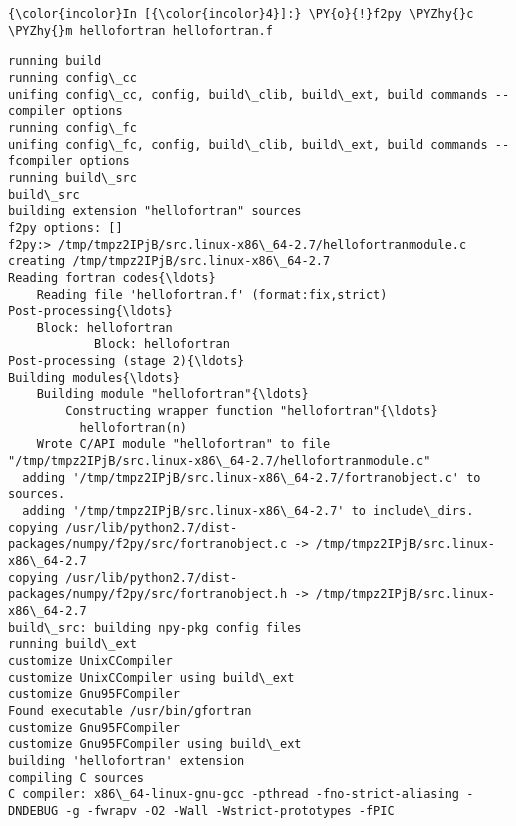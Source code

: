     \begin{Verbatim}[commandchars=\\\{\}]
{\color{incolor}In [{\color{incolor}4}]:} \PY{o}{!}f2py \PYZhy{}c \PYZhy{}m hellofortran hellofortran.f
\end{Verbatim}

    \begin{Verbatim}[commandchars=\\\{\}]
running build
running config\_cc
unifing config\_cc, config, build\_clib, build\_ext, build commands --compiler options
running config\_fc
unifing config\_fc, config, build\_clib, build\_ext, build commands --fcompiler options
running build\_src
build\_src
building extension "hellofortran" sources
f2py options: []
f2py:> /tmp/tmpz2IPjB/src.linux-x86\_64-2.7/hellofortranmodule.c
creating /tmp/tmpz2IPjB/src.linux-x86\_64-2.7
Reading fortran codes{\ldots}
	Reading file 'hellofortran.f' (format:fix,strict)
Post-processing{\ldots}
	Block: hellofortran
			Block: hellofortran
Post-processing (stage 2){\ldots}
Building modules{\ldots}
	Building module "hellofortran"{\ldots}
		Constructing wrapper function "hellofortran"{\ldots}
		  hellofortran(n)
	Wrote C/API module "hellofortran" to file "/tmp/tmpz2IPjB/src.linux-x86\_64-2.7/hellofortranmodule.c"
  adding '/tmp/tmpz2IPjB/src.linux-x86\_64-2.7/fortranobject.c' to sources.
  adding '/tmp/tmpz2IPjB/src.linux-x86\_64-2.7' to include\_dirs.
copying /usr/lib/python2.7/dist-packages/numpy/f2py/src/fortranobject.c -> /tmp/tmpz2IPjB/src.linux-x86\_64-2.7
copying /usr/lib/python2.7/dist-packages/numpy/f2py/src/fortranobject.h -> /tmp/tmpz2IPjB/src.linux-x86\_64-2.7
build\_src: building npy-pkg config files
running build\_ext
customize UnixCCompiler
customize UnixCCompiler using build\_ext
customize Gnu95FCompiler
Found executable /usr/bin/gfortran
customize Gnu95FCompiler
customize Gnu95FCompiler using build\_ext
building 'hellofortran' extension
compiling C sources
C compiler: x86\_64-linux-gnu-gcc -pthread -fno-strict-aliasing -DNDEBUG -g -fwrapv -O2 -Wall -Wstrict-prototypes -fPIC


\end{Verbatim}
